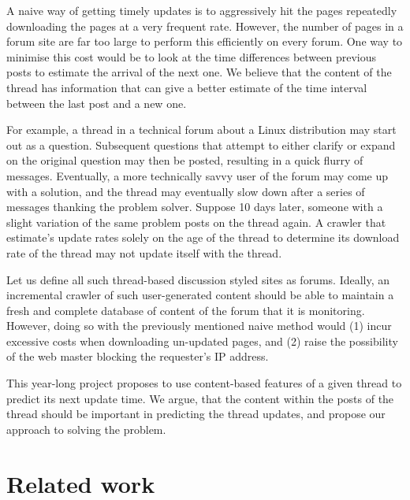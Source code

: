 \documentclass[12 pt]{article}
\begin{document}
A naive way of getting timely updates is to aggressively hit the pages repeatedly downloading the pages at a very frequent rate. However, the number of pages in a forum site are far too large to perform this efficiently on every forum. One way to minimise this cost would be to look at the time differences between previous posts to estimate the arrival of the next one. We believe that the content of the thread has information that can give a better estimate of the time interval between the last post and a new one.


For example, a thread in a technical forum about a Linux distribution may start out as a question. Subsequent questions that attempt to either clarify or expand on the original question may then be posted, resulting in a quick flurry of messages. Eventually, a more technically savvy user of the forum may come up with a solution, and the thread may eventually slow down after a series of messages thanking the problem solver. Suppose 10 days later, someone with a slight variation of the same problem posts on the thread again. A crawler that estimate's update rates solely on the age of the thread to determine its download rate of the thread may not update itself with the thread.

Let us define all such thread-based discussion styled sites as forums. Ideally, an incremental crawler of such user-generated content should be able to maintain a fresh and complete database of content of the forum that it is monitoring. However, doing so with the previously mentioned naive method would (1) incur excessive costs when downloading un-updated pages, and (2) raise the possibility of the web master blocking the requester's IP address.

This year-long project proposes to use content-based features of a given thread to predict its next update time. We argue, that the content within the posts of the thread should be important in predicting the thread updates, and propose our approach to solving the problem.

\section{Related work}
\end{document}
